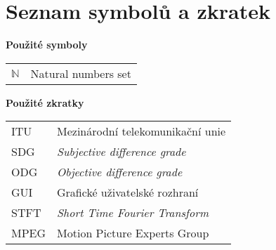 \chapter*{Seznam symbolů a zkratek}

\textbf{Použité symboly}

\begin{tabular}{ll}
{$\mathbb N$} & Natural numbers set

\end{tabular}
\vskip 1cm

\noindent\textbf{Použité zkratky}

\begin{tabular}{ll}
ITU & Mezinárodní telekomunikační unie\\
SDG & \textit{Subjective difference grade}\\
ODG & \textit{Objective difference grade}\\
GUI & Grafické uživatelské rozhraní\\
STFT & \textit{Short Time Fourier Transform}\\
MPEG & Motion Picture Experts Group\\



\end{tabular}
